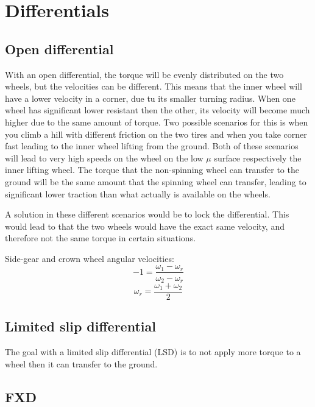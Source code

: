\section{Differentials}

\subsection{Open differential}

With an open differential, the torque will be evenly distributed on the two wheels, but the velocities can be different. This means that the inner wheel will have a lower velocity in a corner, due tu its smaller turning radius. When one wheel has significant lower resistant then the other, its velocity will become much higher due to the same amount of torque. Two possible scenarios for this is when you climb a hill with different friction on the two tires and when you take corner fast leading to the inner wheel lifting from the ground. Both of these scenarios will lead to very high speeds on the wheel on the low $ \mu $ surface respectively the inner lifting wheel. The torque that the non-spinning wheel can transfer to the ground will be the same amount that the spinning wheel can transfer, leading to significant lower traction than what actually is available on the wheels.

A solution in these different scenarios would be to lock the differential. This would lead to that the two wheels would have the exact same velocity, and therefore not the same torque in certain situations. 

Side-gear and crown wheel angular velocities:
\begin{equation}
	-1 = \frac{\omega_{1} - \omega_{r}}{\omega_{2} - \omega_{r}}
\end{equation}
\begin{equation}
	\omega_{r} = \frac{\omega_{1} + \omega_{2}}{2}
\end{equation}

\subsection{Limited slip differential}

The goal with a limited slip differential (LSD) is to not apply more torque to a wheel then it can transfer to the ground.

\subsection{FXD}

